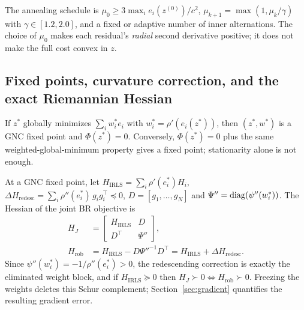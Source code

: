 The annealing schedule is $\mu_0\ge3\max_ie_i(z^{(0)})/c^2$,
$\mu_{k+1}=\max(1,\mu_k/\gamma)$ with $\gamma\in[1.2,2.0]$, and a fixed or adaptive number of inner
alternations. The choice of $\mu_0$ makes each residual's \emph{radial} second derivative positive;
it does not make the full cost convex in $z$.

\subsection{Fixed points, curvature correction, and the exact Riemannian Hessian}

\begin{lemma}\label{lem:fixedpoint}
If $z^*$ globally minimizes $\sum_iw_i^*e_i$ with $w_i^*=\rho'(e_i(z^*))$, then $(z^*,w^*)$ is a
GNC fixed point and $\Phi(z^*)=0$. Conversely, $\Phi(z^*)=0$ plus the same weighted-global-minimum
property gives a fixed point; stationarity alone is not enough.
\end{lemma}

\begin{lemma}[curvature correction $=$ Schur complement]\label{lem:schur}
At a GNC fixed point, let $H_{\mathrm{IRLS}}=\sum_i\rho'(e_i^*)H_i$,
$\Delta H_{\mathrm{redesc}}=\sum_i\rho''(e_i^*)\,g_ig_i^\top\preceq0$, $D=[g_1,\dots,g_N]$ and
$\Psi''=\operatorname{diag}(\psi''(w_i^*))$. The Hessian of the joint BR objective is
\begin{equation}
\begin{aligned}
H_J&=\begin{bmatrix}H_{\mathrm{IRLS}}&D\\D^\top&\Psi''\end{bmatrix},\\
H_{\mathrm{rob}}&=H_{\mathrm{IRLS}}-D\Psi''^{-1}D^\top
=H_{\mathrm{IRLS}}+\Delta H_{\mathrm{redesc}}.
\end{aligned}
\end{equation}
Since $\psi''(w_i^*)=-1/\rho''(e_i^*)>0$, the redescending correction is exactly the eliminated
weight block, and if $H_{\mathrm{IRLS}}\succeq0$ then $H_J\succ0\iff H_{\mathrm{rob}}\succ0$.
Freezing the weights deletes this Schur complement; Section~\ref{sec:gradient} quantifies the
resulting gradient error.
\end{lemma}

